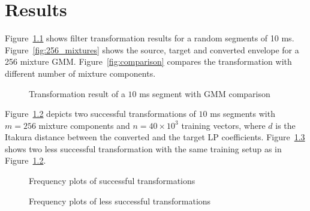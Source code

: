\chapter{Results} %
\label{cha:results}
Figure~\ref{fig:frequency_plots_1} shows filter transformation results for a random segments of 10 ms. Figure~\ref{fig:256_mixtures} shows the source, target and converted envelope for a 256 mixture GMM. Figure~\ref{fig:comparison} compares the transformation with different number of mixture components.
\begin{figure}[htbp]
	\begin{center}
	\caption{Transformation result of a $10$ ms segment with GMM comparison}
	\label{fig:frequency_plots_1}
	\end{center}
\end{figure}

Figure~\ref{fig:frequency_plots_2} depicts two successful transformations of $10$ ms segments with $m=256$ mixture components and $n=40\times 10^3$ training vectors, where $d$ is the Itakura distance between the converted and the target LP coefficients. Figure~\ref{fig:frequency_plots_3} shows two less successful transformation with the same training setup as in Figure~\ref{fig:frequency_plots_2}.
\begin{figure}[htbp]
	\begin{center}
	\caption{Frequency plots of successful transformations}
	\label{fig:frequency_plots_2}
	\end{center}
\end{figure}
\begin{figure}[htbp]
	\begin{center}
	\caption{Frequency plots of less successful transformations}
	\label{fig:frequency_plots_3}
	\end{center}
\end{figure}



